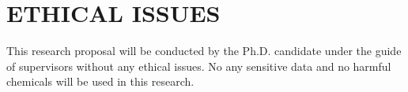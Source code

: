 \section{ETHICAL ISSUES}

This research proposal will be conducted by the Ph.D. candidate under the guide of supervisors without any ethical issues. No any sensitive data and no harmful chemicals will be used in this research.